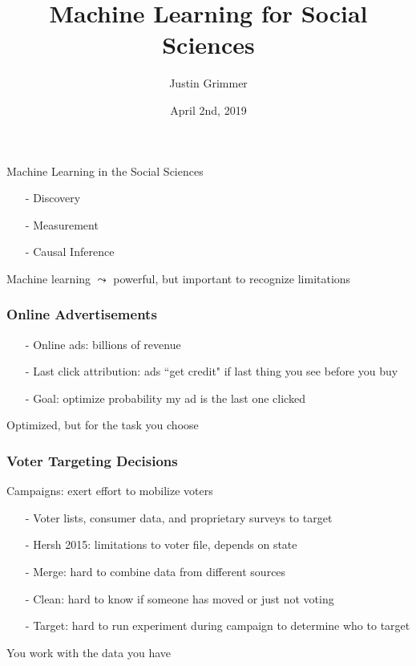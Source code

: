 \documentclass{beamer}
\title[Machine Learning] %
{Machine Learning for Social Sciences}
\author{Justin Grimmer}
\institute[Stanford University]{Professor\\Department of Political Science \\  University of Chicago}
\date{April 2nd, 2019}
\numberwithin{equation}{section}
\begin{document}
\begin{frame}
\titlepage
\end{frame}





\begin{frame}

\huge 

Machine Learning in the Social Sciences 

\begin{itemize}
\item[-] Discovery 
\item[-] Measurement
\item[-] Causal Inference
\end{itemize}  

\end{frame}


\begin{frame}

\huge

Machine learning $\leadsto$ powerful, but important to recognize limitations


\end{frame}




\begin{frame}
\frametitle{Online Advertisements}



\begin{itemize}
\item[-] Online ads: \alert{billions} of revenue
\item[-] Last click attribution: ads ``get credit" if last thing you see before you buy
\item[-] Goal: optimize probability my ad is the last one clicked
\end{itemize}

Optimized, but for the task you choose


\end{frame}  



\begin{frame}
\frametitle{Voter Targeting Decisions}

Campaigns: exert effort to mobilize voters
\begin{itemize}
\item[-] Voter lists, consumer data, and proprietary surveys to target
\item[-] Hersh 2015: limitations to voter file, depends on state
\item[-] \alert{Merge}: hard to combine data from different sources
\item[-] \alert{Clean}: hard to know if someone has moved or just not voting
\item[-] \alert{Target}: hard to run experiment during campaign to determine who to target
\end{itemize}  

You work with the data you have 





\end{frame}
\end{document}
